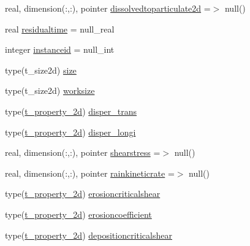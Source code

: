 \begin{DoxyCompactItemize}
real, dimension(\+:,\+:), pointer \mbox{\hyperlink{structmodulerunoffproperties_1_1t__runoffproperties_aa3376a5f4409cd4e2caea9020ed5de0d}{dissolvedtoparticulate2d}} =$>$ null()
\item 
real \mbox{\hyperlink{structmodulerunoffproperties_1_1t__runoffproperties_a984494383291434405868ebf01f9a5cb}{residualtime}} = null\+\_\+real
\item 
integer \mbox{\hyperlink{structmodulerunoffproperties_1_1t__runoffproperties_ae3a4674726dd37ad410cb2df0aee0910}{instanceid}} = null\+\_\+int
\item 
type(t\+\_\+size2d) \mbox{\hyperlink{structmodulerunoffproperties_1_1t__runoffproperties_ac8d87a4bde60548c01149edabfc7e9aa}{size}}
\item 
type(t\+\_\+size2d) \mbox{\hyperlink{structmodulerunoffproperties_1_1t__runoffproperties_a4c5b323a3bd5a98647cd053ad94b85cb}{worksize}}
\item 
type(\mbox{\hyperlink{structmodulerunoffproperties_1_1t__property__2d}{t\+\_\+property\+\_\+2d}}) \mbox{\hyperlink{structmodulerunoffproperties_1_1t__runoffproperties_a8c37d5e3dab041267dff54844831f156}{disper\+\_\+trans}}
\item 
type(\mbox{\hyperlink{structmodulerunoffproperties_1_1t__property__2d}{t\+\_\+property\+\_\+2d}}) \mbox{\hyperlink{structmodulerunoffproperties_1_1t__runoffproperties_a837541a2fa8d7b9390c0eb4851684fc6}{disper\+\_\+longi}}
\item 
real, dimension(\+:,\+:), pointer \mbox{\hyperlink{structmodulerunoffproperties_1_1t__runoffproperties_a0ffedafeccb746be5bd3e0c9bba2b452}{shearstress}} =$>$ null()
\item 
real, dimension(\+:,\+:), pointer \mbox{\hyperlink{structmodulerunoffproperties_1_1t__runoffproperties_a3b3c35a84316d8bc654f993058b780d6}{rainkineticrate}} =$>$ null()
\item 
type(\mbox{\hyperlink{structmodulerunoffproperties_1_1t__property__2d}{t\+\_\+property\+\_\+2d}}) \mbox{\hyperlink{structmodulerunoffproperties_1_1t__runoffproperties_ab05ba0c0fbcf847b2f203a98a2796442}{erosioncriticalshear}}
\item 
type(\mbox{\hyperlink{structmodulerunoffproperties_1_1t__property__2d}{t\+\_\+property\+\_\+2d}}) \mbox{\hyperlink{structmodulerunoffproperties_1_1t__runoffproperties_a88588980676ba931ce3e8fe180c065ba}{erosioncoefficient}}
\item 
type(\mbox{\hyperlink{structmodulerunoffproperties_1_1t__property__2d}{t\+\_\+property\+\_\+2d}}) \mbox{\hyperlink{structmodulerunoffproperties_1_1t__runoffproperties_a505614f0543546993dce1a55f562cf9d}{depositioncriticalshear}}

\end{DoxyCompactItemize}
